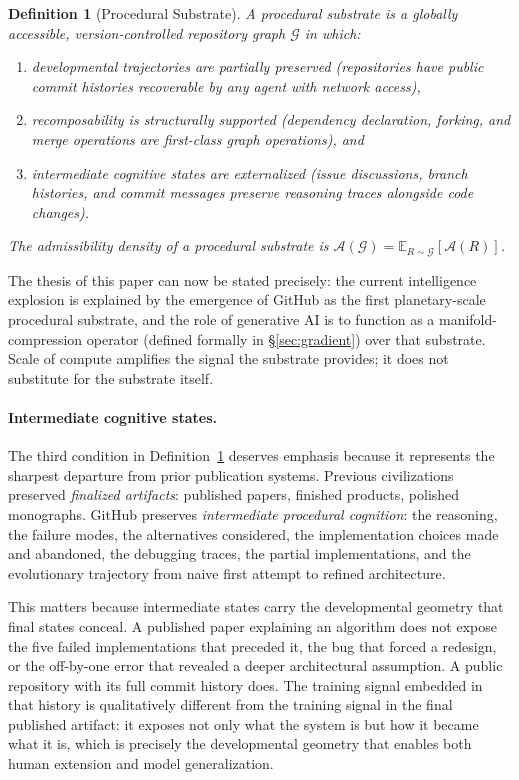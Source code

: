 \documentclass[11pt]{article}
\newtheorem{definition}[theorem]{Definition}
\begin{document}
\begin{definition}[Procedural Substrate]
\label{def:procedural-substrate}
A \emph{procedural substrate} is a globally accessible, version-controlled
repository graph $\mathcal{G}$ in which:
\begin{enumerate}
\item developmental trajectories are partially preserved (repositories have
public commit histories recoverable by any agent with network access),
\item recomposability is structurally supported (dependency declaration,
forking, and merge operations are first-class graph operations), and
\item intermediate cognitive states are externalized (issue discussions,
branch histories, and commit messages preserve reasoning traces alongside
code changes).
\end{enumerate}
The \emph{admissibility density} of a procedural substrate is
$\mathcal{A}(\mathcal{G}) = \mathbb{E}_{R \sim \mathcal{G}}[\mathcal{A}(R)]$.
\end{definition}

The thesis of this paper can now be stated precisely: the current intelligence
explosion is explained by the emergence of GitHub as the first planetary-scale
procedural substrate, and the role of generative AI is to function as a
manifold-compression operator (defined formally in \S\ref{sec:gradient})
over that substrate. Scale of compute amplifies the signal the substrate
provides; it does not substitute for the substrate itself.

\paragraph{Intermediate cognitive states.}
The third condition in Definition~\ref{def:procedural-substrate} deserves
emphasis because it represents the sharpest departure from prior publication
systems. Previous civilizations preserved \emph{finalized artifacts}: published
papers, finished products, polished monographs. GitHub preserves
\emph{intermediate procedural cognition}: the reasoning, the failure modes,
the alternatives considered, the implementation choices made and abandoned,
the debugging traces, the partial implementations, and the evolutionary
trajectory from naive first attempt to refined architecture.

This matters because intermediate states carry the developmental geometry that
final states conceal. A published paper explaining an algorithm does not expose
the five failed implementations that preceded it, the bug that forced a
redesign, or the off-by-one error that revealed a deeper architectural
assumption. A public repository with its full commit history does. The
training signal embedded in that history is qualitatively different from the
training signal in the final published artifact: it exposes not only what
the system is but how it became what it is, which is precisely the developmental
geometry that enables both human extension and model generalization.
\end{document}
